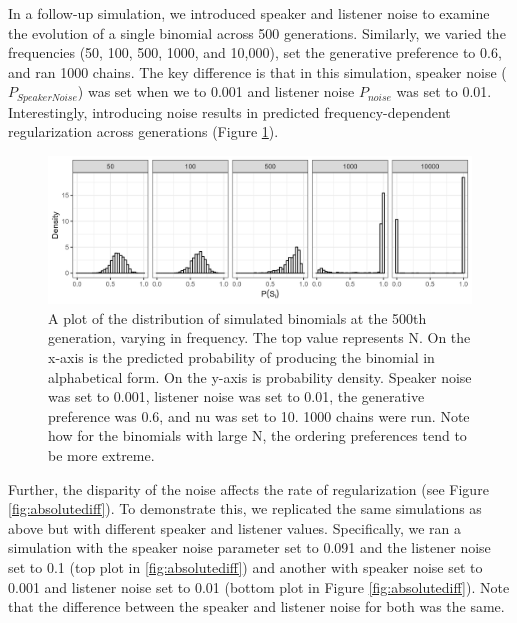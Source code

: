 \documentclass[10pt, letterpaper]{article}
\newenvironment{CodeChunk}{}{}
\begin{document}
In a follow-up simulation, we introduced speaker and listener noise to
examine the evolution of a single binomial across 500 generations.
Similarly, we varied the frequencies (50, 100, 500, 1000, and 10,000),
set the generative preference to 0.6, and ran 1000 chains. The key
difference is that in this simulation, speaker noise
(\(P_{SpeakerNoise}\)) was set when we to 0.001 and listener noise
\(P_{noise}\) was set to 0.01. Interestingly, introducing noise results
in predicted frequency-dependent regularization across generations
(Figure \ref{fig:regularizationplot1}).

\begin{CodeChunk}
\begin{figure}[tb]

{\centering \includegraphics[width=1\linewidth]{Figures/speaker_noise_001_listener_01} 

}

\caption[A plot of the distribution of simulated binomials at the 500th generation, varying in frequency]{A plot of the distribution of simulated binomials at the 500th generation, varying in frequency. The top value represents N. On the x-axis is the predicted probability of producing the binomial in alphabetical form. On the y-axis is probability density. Speaker noise was set to 0.001, listener noise was set to 0.01, the generative preference was 0.6, and nu was set to 10. 1000 chains were run. Note how for the binomials with large N, the ordering preferences tend to be more extreme.}\label{fig:regularizationplot1}
\end{figure}
\end{CodeChunk}

Further, the disparity of the noise affects the rate of regularization
(see Figure \ref{fig:absolutediff}). To demonstrate this, we replicated
the same simulations as above but with different speaker and listener
values. Specifically, we ran a simulation with the speaker noise
parameter set to 0.091 and the listener noise set to 0.1 (top plot in
\ref{fig:absolutediff}) and another with speaker noise set to 0.001 and
listener noise set to 0.01 (bottom plot in Figure
\ref{fig:absolutediff}). Note that the difference between the speaker
and listener noise for both was the same.
\end{document}
